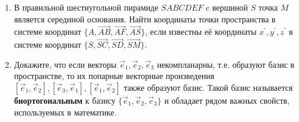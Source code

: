 \begin{enumerate}
   
   \item    
   В правильной шестиугольной пирамиде $SABCDEF$ c вершиной $S$ точка $M$ является серединой основания. Найти координаты точки пространства в системе координат $\{A, \vec{AB}, \vec{AF}, \vec{AS}\}$, если известны её координаты $x^\prime, y^\prime, z^\prime$ в системе координат $\{S, \vec{SC}, \vec{SD}, \vec{SM}\}$.
    
    \item Докажите, что если векторы $\vec e_1, \vec e_2, \vec e_3$ некомпланарны, т.е. образуют базис в пространстве, то их попарные векторные произведения $[\vec e_1, \vec e_2], [\vec e_3, \vec e_1], [\vec e_1, \vec e_2]$ также образуют базис. Такой базис называется \textbf{биортогональным} к базису $\{\vec e_1, \vec e_2, \vec e_3\}$ и обладает рядом важных свойств, используемых в математике.
   
   
\end{enumerate}